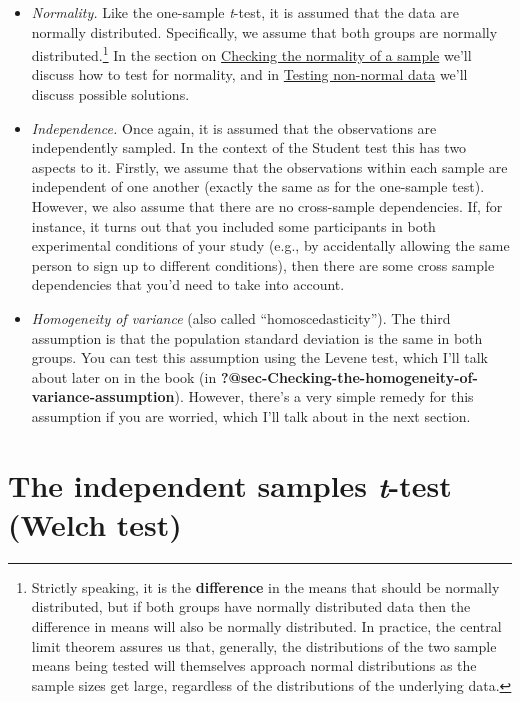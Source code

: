 \documentclass[
  a4paper,
]{book}
\providecommand{\tightlist}{%
  \setlength{\itemsep}{0pt}\setlength{\parskip}{0pt}}\usepackage{longtable,booktabs,array}
\begin{document}
\begin{itemize}
\tightlist
\item
  \emph{Normality.} Like the one-sample \emph{t}-test, it is assumed
  that the data are normally distributed. Specifically, we assume that
  both groups are normally distributed.\footnote{Strictly speaking, it
    is the \textbf{difference} in the means that should be normally
    distributed, but if both groups have normally distributed data then
    the difference in means will also be normally distributed. In
    practice, the central limit theorem assures us that, generally, the
    distributions of the two sample means being tested will themselves
    approach normal distributions as the sample sizes get large,
    regardless of the distributions of the underlying data.} In the
  section on
  \protect\hyperlink{sec-Checking-the-normality-of-a-sample}{Checking
  the normality of a sample} we'll discuss how to test for normality,
  and in \protect\hyperlink{testing-non-normal-data}{Testing non-normal
  data} we'll discuss possible solutions.
\item
  \emph{Independence.} Once again, it is assumed that the observations
  are independently sampled. In the context of the Student test this has
  two aspects to it. Firstly, we assume that the observations within
  each sample are independent of one another (exactly the same as for
  the one-sample test). However, we also assume that there are no
  cross-sample dependencies. If, for instance, it turns out that you
  included some participants in both experimental conditions of your
  study (e.g., by accidentally allowing the same person to sign up to
  different conditions), then there are some cross sample dependencies
  that you'd need to take into account.
\item
  \emph{Homogeneity of variance} (also called ``homoscedasticity''). The
  third assumption is that the population standard deviation is the same
  in both groups. You can test this assumption using the Levene test,
  which I'll talk about later on in the book (in
  \textbf{?@sec-Checking-the-homogeneity-of-variance-assumption}).
  However, there's a very simple remedy for this assumption if you are
  worried, which I'll talk about in the next section.
\end{itemize}

\hypertarget{sec-the-independent-samples-t-test-welch-test}{%
\section{\texorpdfstring{The independent samples \emph{t}-test (Welch
test)}{The independent samples t-test (Welch test)}}\label{sec-the-independent-samples-t-test-welch-test}}
\end{document}
